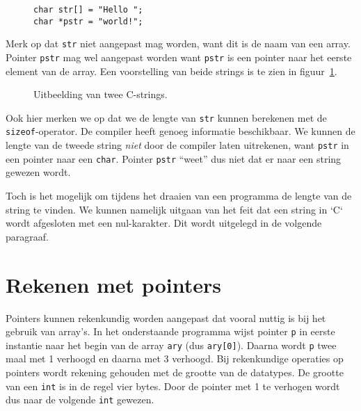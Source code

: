 \begin{figure}[!ht]
\begin{lstlisting}[caption=Declaratie en initialisatie van twee C-strings.,label=cod:poistrings]
char str[] = "Hello ";
char *pstr = "world!";
\end{lstlisting}
\end{figure}

Merk op dat \texttt{str} niet aangepast mag worden, want dit is de naam van een array. Pointer \texttt{pstr} mag wel aangepast worden want \texttt{pstr} is een pointer naar het eerste element van de array. Een voorstelling van beide strings is te zien in figuur~\ref{fig:poistrings}.

\begin{figure}[!ht]
\centering
{}
\caption{Uitbeelding van twee C-strings.}
\label{fig:poistrings}
\end{figure}

Ook hier merken we op dat we de lengte van \texttt{str} kunnen berekenen met de \texttt{sizeof}-operator. De compiler heeft genoeg informatie beschikbaar. We kunnen de lengte van de tweede string \textsl{niet} door de compiler laten uitrekenen, want \texttt{pstr} in een pointer naar een \texttt{char}. Pointer \texttt{pstr} ``weet'' dus niet dat er naar een string gewezen wordt.

Toch is het mogelijk om tijdens het draaien van een programma de lengte van de string te vinden. We kunnen namelijk uitgaan van het feit dat een string in `C` wordt afgesloten met een nul-karakter. Dit wordt uitgelegd in de volgende paragraaf.

\section{Rekenen met pointers}
\label{sec:rekenenmetpointers}
Pointers kunnen rekenkundig worden aangepast dat vooral nuttig is bij het gebruik van array's.
In het onderstaande programma wijst pointer \texttt{p} in eerste instantie naar het begin van de array \texttt{ary} (dus \texttt{ary[0]}). Daarna wordt \texttt{p} twee maal met 1 verhoogd en daarna met 3 verhoogd. Bij rekenkundige operaties op pointers wordt rekening gehouden met de grootte van de datatypes. De grootte van een \texttt{int} is in de regel vier bytes. Door de pointer met 1 te verhogen wordt dus naar de volgende \texttt{int} gewezen.

